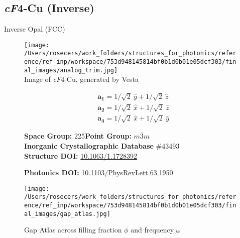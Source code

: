 \subsection{\large{\textit{cF}4-Cu (Inverse)}}\vspace{-0.1in}
Inverse Opal (FCC)


\begin{figure}[H]
\begin{minipage}{0.34\textwidth}\centering
\texttt{[image: /Users/rosecers/work\_folders/structures\_for\_photonics/reference/ref\_inp/workspace/753d948145814bf0b1d0b01e05dcf303/final\_images/analog\_trim.jpg]}\\
\small{Image of \textit{cF}4-Cu, generated by Vesta}
\end{minipage}\hfill
\begin{minipage}{0.65\textwidth}\raggedright
{\setlength{\mathindent}{0cm}
\begin{equation*}
\begin{split}&\boldsymbol{a_1} = 1/\sqrt{2}\ \hat{y} + 1/\sqrt{2}\ \hat{z}\\[-8pt]
&\boldsymbol{a_2} = 1/\sqrt{2}\ \hat{x} + 1/\sqrt{2}\ \hat{z}\\[-8pt]
&\boldsymbol{a_3} = 1/\sqrt{2}\ \hat{x} + 1/\sqrt{2}\ \hat{y}
\end{split}
\end{equation*}}

\textbf{Space Group:}	225\hspace{0.5in}\textbf{Point Group:}	$m\bar{3}m$\\
\textbf{Inorganic Crystallographic Database} \#43493\\
\textbf{Structure DOI: }\url{10.1063/1.1728392}

\textbf{Photonics DOI: }\url{10.1103/PhysRevLett.63.1950}
\end{minipage}\hfill
\end{figure}
\vspace{-0.25in}


\begin{figure}[H]
\begin{minipage}{0.9\textwidth}\centering
\texttt{[image: /Users/rosecers/work\_folders/structures\_for\_photonics/reference/ref\_inp/workspace/753d948145814bf0b1d0b01e05dcf303/final\_images/gap\_atlas.jpg]}
\\
\end{minipage}\hfill\caption{Gap Atlas across filling fraction $\phi$ and frequency $\omega$}
\end{figure}


